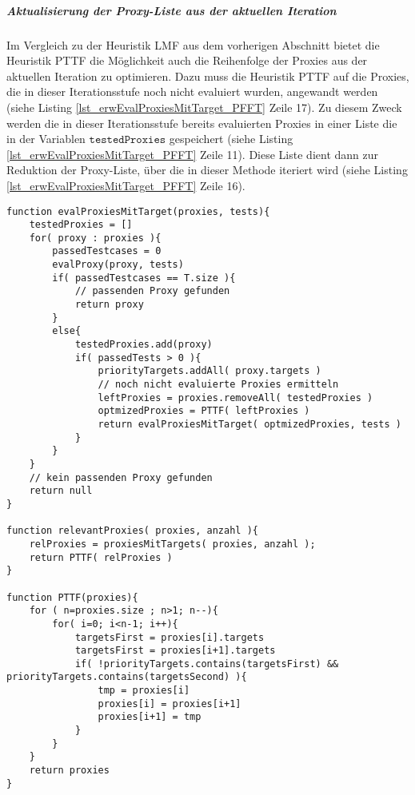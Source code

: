 \documentclass[a4paper,12pt]{article}
\begin{document}
\subparagraph{Aktualisierung der Proxy-Liste aus der aktuellen Iteration}
\noindent
\newline
Im Vergleich zu der Heuristik LMF aus dem vorherigen Abschnitt bietet die Heuristik PTTF die Möglichkeit auch die Reihenfolge der Proxies aus der aktuellen Iteration zu optimieren. Dazu muss die Heuristik PTTF auf die Proxies, die in dieser Iterationsstufe noch nicht evaluiert wurden, angewandt werden (siehe Listing \ref{lst_erwEvalProxiesMitTarget_PFFT} Zeile 17). Zu diesem Zweck werden die in dieser Iterationsstufe bereits evaluierten Proxies in einer Liste die in der Variablen $\texttt{testedProxies}$ gespeichert (siehe Listing \ref{lst_erwEvalProxiesMitTarget_PFFT} Zeile 11). Diese Liste dient dann zur Reduktion der Proxy-Liste, über die in dieser Methode iteriert wird (siehe Listing \ref{lst_erwEvalProxiesMitTarget_PFFT} Zeile 16). 
\begin{lstlisting}[style = pseudo, caption = Auswertung des Testergebnisses mit Heuristik PTTF, captionpos = b, label = lst_erwEvalProxiesMitTarget_PFFT]
function evalProxiesMitTarget(proxies, tests){
	testedProxies = []
	for( proxy : proxies ){
		passedTestcases = 0
		evalProxy(proxy, tests)
		if( passedTestcases == T.size ){
			// passenden Proxy gefunden
			return proxy
		}
		else{
			testedProxies.add(proxy)
			if( passedTests > 0 ){
				priorityTargets.addAll( proxy.targets )
				// noch nicht evaluierte Proxies ermitteln
				leftProxies = proxies.removeAll( testedProxies )
				optmizedProxies = PTTF( leftProxies )
				return evalProxiesMitTarget( optmizedProxies, tests )
			}
		}
	}
	// kein passenden Proxy gefunden
	return null
}

function relevantProxies( proxies, anzahl ){
	relProxies = proxiesMitTargets( proxies, anzahl );
	return PTTF( relProxies )
} 

function PTTF(proxies){
	for	( n=proxies.size ; n>1; n--){
		for( i=0; i<n-1; i++){
			targetsFirst = proxies[i].targets
			targetsFirst = proxies[i+1].targets			
			if( !priorityTargets.contains(targetsFirst) && priorityTargets.contains(targetsSecond) ){
				tmp = proxies[i]
				proxies[i] = proxies[i+1]
				proxies[i+1] = tmp
			}
		}
	}
	return proxies	
}
\end{lstlisting}
\end{document}

